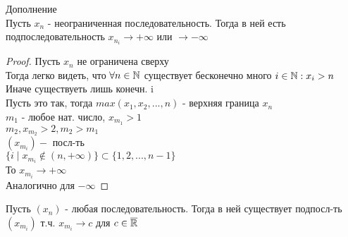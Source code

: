 Дополнение \\
Пусть $x_n$ - неограниченная последовательность. Тогда в ней есть подпоследовательность $ x_{n_i}  \rightarrow +\infty $ или $ \rightarrow -\infty $ \\
\begin{proof}
	Пусть $ x_n $ не ограничена сверху \\
	Тогда легко видеть, что $ \forall n \in \mathbb{N} $ существует бесконечно много $ i \in \mathbb{N} : x_i > n $ \\
	Иначе существуеть лишь конечн. i \\
	Пусть это так, тогда $ max(x_1, x_2, ..., n) $ - верхняя граница $x_n$\\
	$ m_1 $ - любое нат. число, $ x_{m_1} > 1 $ \\
	$ m_2, x_{m_2} > 2, m_2 > m_1 $ \\
	$ (x_{m_i})  -$ посл-ть \\
	$ \{i \mid x_{m_i} \notin (n, +\infty) \} \subset \{ 1,2,..., n-1 \} $ \\
	То $ x_{m_i} \rightarrow +\infty $\\
	Аналогично для $ -\infty $ 
\end{proof} 
\begin{consequence}
	Пусть $ (x_n) $ - любая последовательность. Тогда в ней существует подпосл-ть $ (x_{m_i}) $ т.ч. $ x_{m_i} \rightarrow c $ для $ c \in \overline{\mathbb{R}} $ 
\end{consequence}

